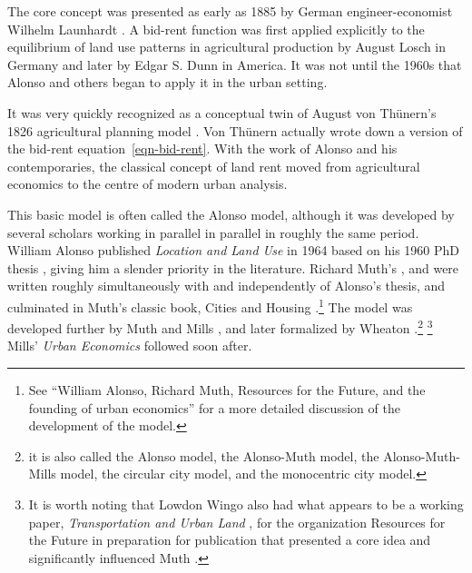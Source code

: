 The core concept was presented as early as 1885  by German engineer-economist Wilhelm Launhardt \cite{blaugEconomicTheoryRetrospect1985, launhardtMathematischeBegruendungVolkswirthschaftslehre1885}. A \gls{bid-rent function} was first applied explicitly to the equilibrium of land use patterns in agricultural production by August Losch \cite{loschEconomicsLocation1954} in Germany and later by Edgar S. Dunn \cite{dunnEquilibriumLandUsePatterns1954} in America. It was not until the 1960s that Alonso and others began to apply it in the urban setting. 

It was  very quickly recognized as a conceptual twin of August von Th\"unern's 1826 agricultural planning model \cite{vonthunenIsolirteStaatBeziehung1826}. Von Th\"unern actually wrote down a version of the bid-rent equation~\ref{eqn-bid-rent}. With the work of Alonso and his contemporaries, the classical concept of land rent  moved  from  agricultural economics to the centre of modern urban analysis.   

This basic model is often called the Alonso model, although it  was developed by several scholars working in parallel in parallel in roughly the same period. William Alonso published \textit{Location and Land Use} in 1964  \cite{alonsoLocationLandUse1964} based on his 1960 PhD thesis \cite{alonsoModelUrbanLand1960},  
giving him a slender priority in the literature. 
Richard Muth's \cite{muthSpatialStructureHousing1961}, and \cite{muthRationalExpectationsTheory1961} were written roughly simultaneously with and independently of Alonso's thesis, and culminated in Muth's classic book, Cities and Housing  \cite{muthCitiesHousingSpatial1969}.\footnote{See ``William Alonso, Richard Muth, Resources for  the Future, and the founding of urban economics''\cite{mcdonaldWilliamAlonsoRichard2007} for a more detailed discussion of the development of the model.}  %
 The model was developed further by Muth \cite{muthCitiesHousingSpatial1969} and Mills \cite{millsAggregativeModelResource1967}, and later formalized by Wheaton \cite{wheatonComparativeStaticAnalysis1974}.\footnote{it is also called the Alonso model, the Alonso-Muth model, the Alonso-Muth-Mills model, the circular city model, and the monocentric city model.} %
\footnote{It is worth noting that Lowdon Wingo also had what appears to be a working paper, \textit{Transportation and Urban Land} \cite{wingoTransportationUrbanLand1961}, for the organization Resources for the Future  in preparation for publication that presented a core idea and  significantly influenced Muth \cite{mcdonaldWilliamAlonsoRichard2007}.} Mills' \textit{Urban Economics} \cite{millsUrbanEconomics1972} followed soon after. 

